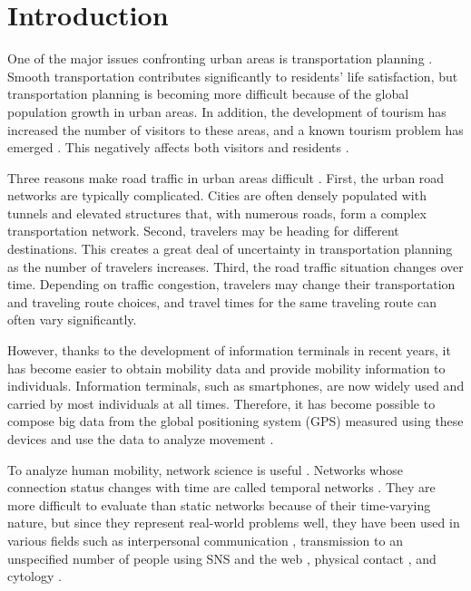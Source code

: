 \documentclass[conference]{IEEEtran}
\begin{document}
\section{Introduction}
\par One of the major issues confronting urban areas is transportation planning \cite{banister2008sustainable}.
Smooth transportation contributes significantly to residents’ life satisfaction, but transportation planning is becoming more difficult because of the global population growth in urban areas.
In addition, the development of tourism has increased the number of visitors to these areas, and a  known tourism problem has emerged \cite{goodwin2017challenge}.
This negatively affects both visitors and residents \cite{goodwin2017challenge}\cite{milano2018overtourism}\cite{seraphin2018over}.
\par Three reasons make road traffic in urban areas difficult \cite{xue2009traffic}.
First, the urban road networks are typically complicated.
Cities are often densely populated with tunnels and elevated structures that, with numerous roads, form a complex transportation network.
Second, travelers may be heading for different destinations.
This creates a great deal of uncertainty in transportation planning as the number of travelers increases.
Third, the road traffic situation changes over time.
Depending on traffic congestion, travelers may change their transportation and traveling route choices, and travel times for the same traveling route can often vary significantly.
\par However, thanks to the development of information terminals in recent years, it has become easier to obtain mobility data and provide mobility information to individuals.
Information terminals, such as smartphones, are now widely used and carried by most individuals at all times.
Therefore, it has become possible to compose big data from the global positioning system (GPS) measured using these devices and use the data to analyze movement \cite{chen2015design}.
\par To analyze human mobility, network science is useful \cite{barabasi2016network}\cite{lu2013theory}.
Networks whose connection status changes with time are called temporal networks \cite{holme2012temporal}.
They are more difficult to evaluate than static networks because of their time-varying nature, but since they represent real-world problems well, they have been used in various fields such as interpersonal communication \cite{eckmann2004entropy}\cite{iribarren2009impact}\cite{panisson2012dynamics}\cite{vazquez2007impact}, transmission to an unspecified number of people using SNS and the web \cite{adar2005tracking}\cite{kumar2005bursty}\cite{java2007we}\cite{kwak2010twitter}, physical contact \cite{wasserman1994social}\cite{eagle2006reality}\cite{isella2011close}\cite{stehle2011high}, and cytology \cite{przytycka2010toward}\cite{lebre2009inferring}\cite{lebre2010statistical}\cite{rao2007inferring}.
\end{document}
